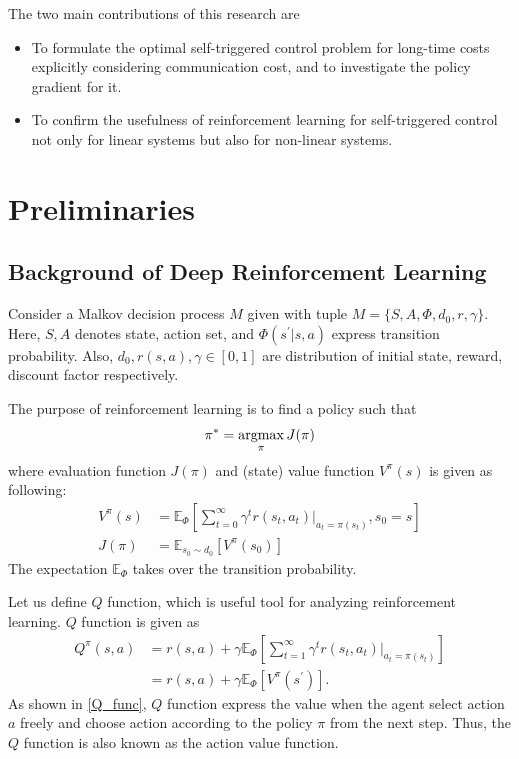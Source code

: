 \documentclass[english, dvipdfmx]{ampmt}             %
\newcommand{\argmax}{\mathop{\rm argmax}\limits}
\newcommand{\expect}{\mathbb{E}}
\begin{document}
The two main contributions of this research are
\begin{itemize}
	\item To formulate the optimal self-triggered control problem for long-time costs explicitly considering communication cost, and to investigate the policy gradient for it.
	\item To confirm the usefulness of reinforcement learning for self-triggered control not only for linear systems but also for non-linear systems.
\end{itemize}

\section{Preliminaries}
\subsection{Background of Deep Reinforcement Learning}
Consider a Malkov decision process $M$ given with tuple $M=\{S,A,\Phi,d_0,r,\gamma\}$. Here, $S,A$ denotes state, action set, and $\Phi(s^{'}|s,a)$ express transition probability. Also, $d_0,r(s,a),\gamma\in[0,1]$ are distribution of initial state, reward, discount factor respectively. \par
The purpose of reinforcement learning is to find a policy such that
\begin{equation}
	\pi^{*}=\argmax_{\pi}J(\pi) \label{purpose_of_rl}
\end{equation} 
where evaluation function $J(\pi)$ and (state) value function $V^{\pi}(s)$ is given as following:
\begin{align}
	V^{\pi}(s) &= \expect_{\Phi}\left[\sum_{t=0}^{\infty}\gamma^tr(s_t, a_t)|_{a_t=\pi(s_t)}, s_0 = s\right]\\
	J(\pi) &= \expect_{s_0\sim d_0}[V^{\pi}(s_0)]
\end{align}
The expectation $\expect_{\Phi}$ takes over the transition probability.\par
Let us define $Q$ function, which is useful tool for analyzing reinforcement learning. $Q$ function is given as 
\begin{align}
	Q^{\pi}(s,a) &= r(s, a) + \gamma\expect_{\Phi}\left[\sum_{t=1}^{\infty}\gamma^tr(s_t, a_t)|_{a_t=\pi(s_t)} \right]\nonumber\\
			    &= r(s, a) + \gamma \expect_{\Phi}[V^{\pi}(s^{\prime})]. \label{Q_func}
\end{align}
As shown in \eqref{Q_func}, $Q$ function express the value when the agent select action $a$ freely and choose action according to the policy $\pi$ from the next step. Thus, the $Q$ function is also known as the action value function.
\end{document}
